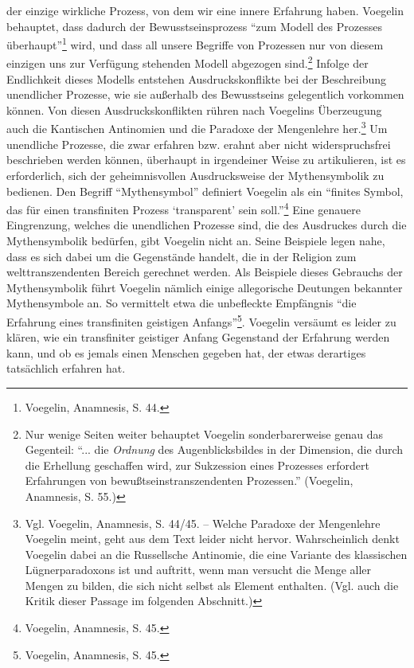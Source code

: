 der einzige wirkliche Prozess, von dem wir eine innere Erfahrung haben.
Voegelin behauptet, dass dadurch der Bewusstseinsprozess "`zum Modell des
Prozesses überhaupt"'\footnote{Voegelin, Anamnesis, S. 44.}  wird, und dass
all unsere Begriffe von Prozessen nur von diesem einzigen uns zur Verfügung
stehenden Modell abgezogen sind.\footnote{Nur wenige Seiten weiter behauptet
  Voegelin sonderbarerweise genau das Gegenteil: "`...  die {\it Ordnung} des
  Augenblicksbildes in der Dimension, die durch die Erhellung geschaffen wird,
  zur Sukzession eines Prozesses erfordert Erfahrungen von
  bewußtseinstranszendenten Prozessen."'  (Voegelin, Anamnesis, S. 55.)}
Infolge der Endlichkeit dieses Modells entstehen Ausdruckskonflikte bei der
Beschreibung unendlicher Prozesse, wie sie außerhalb des Bewusstseins
gelegentlich vorkommen können. Von diesen Ausdruckskonflikten rühren nach
Voegelins Überzeugung auch die Kantischen Antinomien und die Paradoxe der
Mengenlehre her.\footnote{Vgl.  Voegelin, Anamnesis, S. 44/45. -- Welche
  Paradoxe der Mengenlehre Voegelin meint, geht aus dem Text leider nicht
  hervor.  Wahrscheinlich denkt Voegelin dabei an die Russellsche Antinomie,
  die eine Variante des klassischen Lügnerparadoxons ist und auftritt, wenn
  man versucht die Menge aller Mengen zu bilden, die sich nicht selbst als
  Element enthalten.  (Vgl. auch die Kritik dieser Passage im folgenden
  Abschnitt.)}  Um unendliche Prozesse, die zwar erfahren bzw. erahnt aber
nicht widerspruchsfrei beschrieben werden können, überhaupt in irgendeiner
Weise zu artikulieren, ist es erforderlich, sich der geheimnisvollen
Ausdrucksweise der Mythensymbolik zu bedienen. Den Begriff "`Mythensymbol"'
definiert Voegelin als ein "`finites Symbol, das für einen transfiniten
Prozess `transparent' sein soll."'\footnote{Voegelin, Anamnesis, S. 45.} Eine
genauere Eingrenzung, welches die unendlichen Prozesse sind, die des
Ausdruckes durch die Mythensymbolik bedürfen, gibt Voegelin nicht an.  Seine
Beispiele legen nahe, dass es sich dabei um die Gegenstände handelt, die in
der Religion zum welttranszendenten Bereich gerechnet werden.  Als Beispiele
dieses Gebrauchs der Mythensymbolik führt Voegelin nämlich einige allegorische
Deutungen bekannter Mythensymbole an. So vermittelt etwa die unbefleckte
Empfängnis "`die Erfahrung eines transfiniten geistigen
Anfangs"'\footnote{Voegelin, Anamnesis, S. 45.}.  Voegelin versäumt es leider
zu klären, wie ein transfiniter geistiger Anfang Gegenstand der Erfahrung
werden kann, und ob es jemals einen Menschen gegeben hat, der etwas derartiges
tatsächlich erfahren hat.

